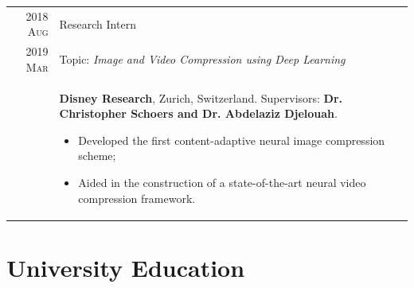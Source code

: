 \documentclass[a4paper,11pt]{article}
\begin{document}
\begin{tabular}{r|p{13cm}}
      \textsc{2018 Aug} & Research Intern \\
      \textsc{2019 Mar} & Topic: \emph{Image and Video Compression using Deep Learning} \\
				& \footnotesize{\textbf{Disney Research}, Zurich, Switzerland. Supervisors: \textbf{Dr. Christopher Schoers and Dr. Abdelaziz Djelouah}.}
        \begin{itemize}[leftmargin=*,noitemsep]
          \item \footnotesize{
            Developed the first content-adaptive neural image compression scheme;}
          \item  \footnotesize{
            Aided in the construction of a state-of-the-art neural video compression framework.}
          \end{itemize} \vspace*{-\baselineskip}

    \end{tabular}


    \vspace{25pt}

    \section{University Education}
\end{document}
